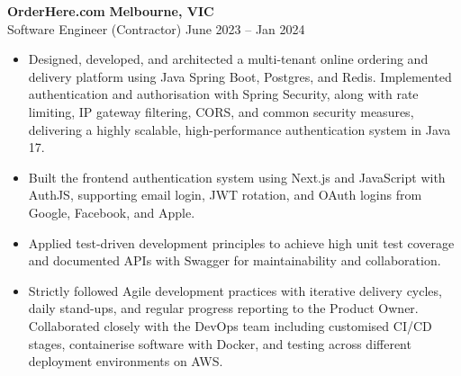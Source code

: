 \documentclass[11pt, letterpaper]{article}
\begin{document}
\noindent\scriptsize \textbf{OrderHere.com} \hfill \textbf{Melbourne, VIC} \\
\scriptsize {Software Engineer (Contractor)} \hfill June 2023 -- Jan 2024
\vspace{-0.5em}
\begin{itemize}
    \setlength\itemsep{-0.2em}
    \setlength\leftskip{-2em}
    \setlength{}
    \setlength\itemindent{0em}  
    \item Designed, developed, and architected a multi-tenant online ordering and delivery platform using Java Spring Boot, Postgres, and Redis. Implemented authentication and authorisation with Spring Security, along with rate limiting, IP gateway filtering, CORS, and common security measures, delivering a highly scalable, high-performance authentication system in Java 17.
    \item Built the frontend authentication system using Next.js and JavaScript with AuthJS, supporting email login, JWT rotation, and OAuth logins from Google, Facebook, and Apple.
    \item Applied test-driven development principles to achieve high unit test coverage and documented APIs with Swagger for maintainability and collaboration.
    \item Strictly followed Agile development practices with iterative delivery cycles, daily stand-ups, and regular progress reporting to the Product Owner. Collaborated closely with the DevOps team including customised CI/CD stages, containerise software with Docker, and testing across different deployment environments on AWS.
\end{itemize}
\vspace{0.5em}
\end{document}
